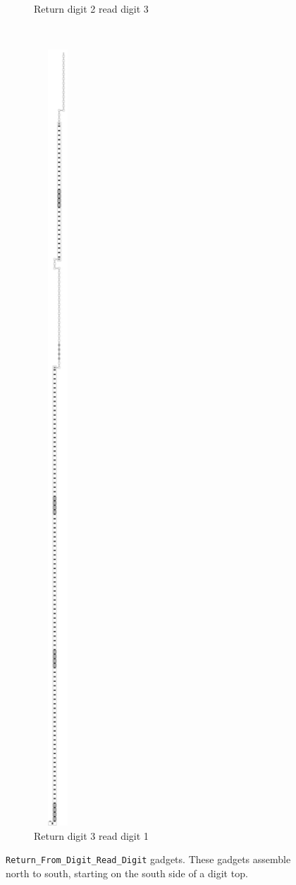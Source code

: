 \begin{figure}[H]
\begin{subfigure}[t]{0.2\textwidth}
        \caption{\label{fig:return_digit2_read_digit3_general} Return digit 2 read digit 3}
    \end{subfigure}%
    ~
    \begin{subfigure}[t]{0.2\textwidth}
        \centering
        \includegraphics[width=0.2\textwidth]{return_paths/return_digit3_read_digit1_general}
        \caption{\label{fig:return_digit3_read_digit1_general} Return digit 3 read digit 1}
    \end{subfigure}%
    \caption{\label{fig:return_path_same_row} {\tt Return\_From\_Digit\_Read\_Digit} gadgets. These gadgets assemble north to south, starting on the south side of a digit top.}
\end{figure}
